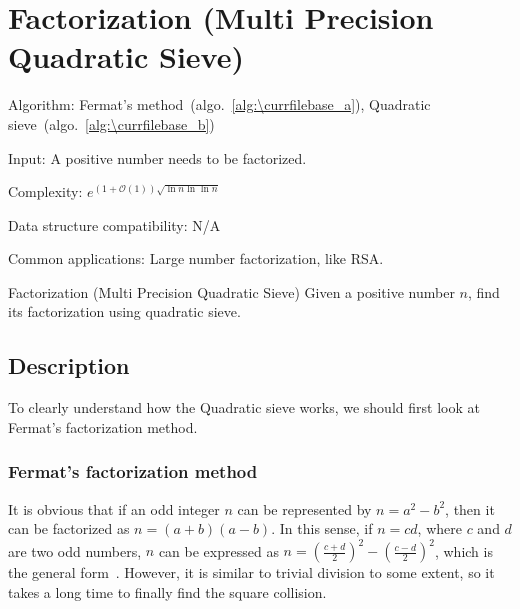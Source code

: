 \documentclass[catalog.tex]{subfiles}
\begin{document}
%
%

\def\pbname{Factorization (Multi Precision Quadratic Sieve)} %

\section{\pbname} 

\begin{overview}
\item [Algorithm:] Fermat's method~(algo.~\ref{alg:\currfilebase_a}), Quadratic sieve~(algo.~\ref{alg:\currfilebase_b}) 
\item [Input:] A positive number needs to be factorized.
\item [Complexity:] $e^{(1+\mathcal{O}(1))\sqrt{\ln n \ln \ln n}}$
\item [Data structure compatibility:] N/A
\item [Common applications:] Large number factorization, like RSA.
\end{overview}


\begin{problem}{\pbname}
	Given a positive number $n$, find its factorization using quadratic sieve.
\end{problem}


\subsection*{Description}
To clearly understand how the Quadratic sieve works, we should first look at Fermat's factorization method.

\subsubsection{Fermat's factorization method}
It is obvious that if an odd integer $n$ can be represented by $n = a^2 - b^2$, then it can be factorized as $n = (a+b)(a-b)$. In this sense, if $n=cd$, where $c$ and $d$ are two odd numbers, $n$ can be expressed as $n = (\frac{c+d}{2})^2 - (\frac{c-d}{2})^2$, which is the general form~\cite{gupta2009revisiting}. However, it is similar to trivial division to some extent, so it takes a long time to finally find the square collision.
\end{document}
